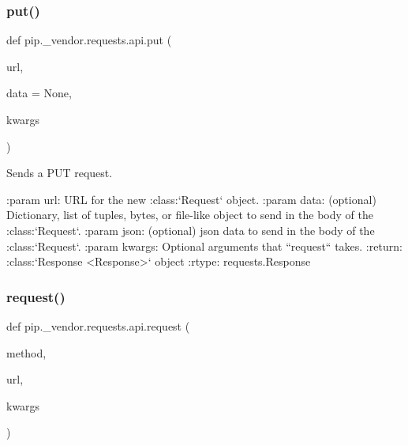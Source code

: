 \subsubsection{\texorpdfstring{put()}{put()}}
{\footnotesize\ttfamily def pip.\+\_\+vendor.\+requests.\+api.\+put (\begin{DoxyParamCaption}\item[{}]{url,  }\item[{}]{data = {\ttfamily None},  }\item[{}]{kwargs }\end{DoxyParamCaption})}

\begin{DoxyVerb}Sends a PUT request.

:param url: URL for the new :class:`Request` object.
:param data: (optional) Dictionary, list of tuples, bytes, or file-like
    object to send in the body of the :class:`Request`.
:param json: (optional) json data to send in the body of the :class:`Request`.
:param \*\*kwargs: Optional arguments that ``request`` takes.
:return: :class:`Response <Response>` object
:rtype: requests.Response
\end{DoxyVerb}
 \mbox{\label{namespacepip_1_1__vendor_1_1requests_1_1api_a7b51e66340bead9a75bffec33d6e5aa7}} 
\subsubsection{\texorpdfstring{request()}{request()}}
{\footnotesize\ttfamily def pip.\+\_\+vendor.\+requests.\+api.\+request (\begin{DoxyParamCaption}\item[{}]{method,  }\item[{}]{url,  }\item[{}]{kwargs }\end{DoxyParamCaption})}

